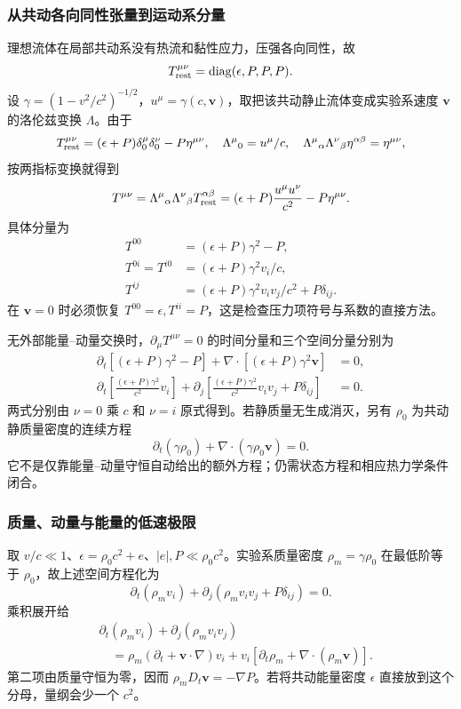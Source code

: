 \documentclass[UTF8,zihao=-4,fontset=fandol,a4paper]{ctexart}
\newcommand{\vect}[1]{\bm{#1}}\newcommand{\dd}{\mathrm d}\newcommand{\pd}{\partial}
\begin{document}
\subsubsection*{从共动各向同性张量到运动系分量}
理想流体在局部共动系没有热流和黏性应力，压强各向同性，故
\[
T_{\rm rest}^{\mu\nu}=\operatorname{diag}(\epsilon,P,P,P).
\]
设 $\gamma=(1-v^2/c^2)^{-1/2}$，$u^\mu=\gamma(c,\vect v)$，取把该共动静止流体变成实验系速度 $\vect v$ 的洛伦兹变换 $\Lambda$。由于
\[
T_{\rm rest}^{\mu\nu}=(\epsilon+P)\delta^\mu_0\delta^\nu_0-P\eta^{\mu\nu},
\quad \Lambda^\mu{}_0=u^\mu/c,\quad
\Lambda^\mu{}_{\alpha}\Lambda^\nu{}_{\beta}\eta^{\alpha\beta}=\eta^{\mu\nu},
\]
按两指标变换就得到
\[
T^{\mu\nu}
=\Lambda^\mu{}_{\alpha}\Lambda^\nu{}_{\beta}T_{\rm rest}^{\alpha\beta}
=(\epsilon+P)\frac{u^\mu u^\nu}{c^2}-P\eta^{\mu\nu}.
\]
具体分量为
\begin{align*}
T^{00}&=(\epsilon+P)\gamma^2-P,\\
T^{0i}=T^{i0}&=(\epsilon+P)\gamma^2v_i/c,\\
T^{ij}&=(\epsilon+P)\gamma^2v_iv_j/c^2+P\delta_{ij}.
\end{align*}
在 $\vect v=0$ 时必须恢复 $T^{00}=\epsilon,T^{ii}=P$，这是检查压力项符号与系数的直接方法。

无外部能量--动量交换时，$\partial_\mu T^{\mu\nu}=0$ 的时间分量和三个空间分量分别为
\begin{align*}
\partial_t[(\epsilon+P)\gamma^2-P]
+\nabla\cdot[(\epsilon+P)\gamma^2\vect v]&=0,\\
\partial_t\!\left[\frac{(\epsilon+P)\gamma^2}{c^2}v_i\right]
+\partial_j\!\left[\frac{(\epsilon+P)\gamma^2}{c^2}v_iv_j+P\delta_{ij}\right]&=0.
\end{align*}
两式分别由 $\nu=0$ 乘 $c$ 和 $\nu=i$ 原式得到。若静质量无生成消灭，另有 $\rho_0$ 为共动静质量密度的连续方程
\[
\partial_t(\gamma\rho_0)+\nabla\cdot(\gamma\rho_0\vect v)=0.
\]
它不是仅靠能量--动量守恒自动给出的额外方程；仍需状态方程和相应热力学条件闭合。

\subsubsection*{质量、动量与能量的低速极限}
取 $v/c\ll1$、$\epsilon=\rho_0c^2+e$、$|e|,P\ll\rho_0c^2$。实验系质量密度 $\rho_m=\gamma\rho_0$ 在最低阶等于 $\rho_0$，故上述空间方程化为
\[
\partial_t(\rho_m v_i)+\partial_j(\rho_m v_iv_j+P\delta_{ij})=0.
\]
乘积展开给
\begin{align*}
&\partial_t(\rho_m v_i)+\partial_j(\rho_m v_iv_j)\\
&\quad=\rho_m(\partial_t+\vect v\cdot\nabla)v_i
+v_i[\partial_t\rho_m+\nabla\cdot(\rho_m\vect v)].
\end{align*}
第二项由质量守恒为零，因而 $\rho_mD_t\vect v=-\nabla P$。若将共动能量密度 $\epsilon$ 直接放到这个分母，量纲会少一个 $c^2$。
\end{document}
